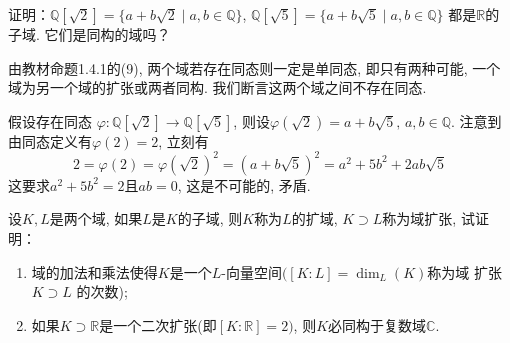 \begin{problem}
    证明：$\mathbb{Q}[\sqrt 2] = \{a + b\sqrt 2 \mid a, b \in \mathbb{Q}\}$,
$\mathbb{Q}[\sqrt 5] = \{a + b\sqrt 5 \mid a, b \in \mathbb{Q}\}$
都是$\mathbb{R}$的子域. 它们是同构的域吗？
\end{problem}

\begin{solution}
    由教材命题1.4.1的(9), 两个域若存在同态则一定是单同态, 即只有两种可能, 
    一个域为另一个域的扩张或两者同构. 我们断言这两个域之间不存在同态.
    
    假设存在同态
$\varphi: \mathbb{Q}[\sqrt{2}] \to \mathbb{Q}[\sqrt{5}]$,
则设$\varphi(\sqrt{2}) = a + b\sqrt{5},\, a, b \in \mathbb{Q}$.
注意到由同态定义有$\varphi(2) = 2$, 立刻有
\[
    2 = \varphi(2) = \varphi(\sqrt{2})^2 = (a + b\sqrt{5})^2 = a^2 + 5b^2 + 2ab\sqrt{5}
\]
这要求$a^2 + 5b^2 = 2$且$ab = 0$, 这是不可能的, 矛盾.
\end{solution}

\begin{problem}\label{ex:1.4.9}
    设$K, L$是两个域, 如果$L$是$K$的子域, 则$K$称为$L$的扩域,
$K \supset L$称为域扩张, 试证明：
\begin{enumerate}[(1)]
    \item 域的加法和乘法使得$K$是一个$L$-向量空间$([K:L] = \dim_L(K)$称为域
扩张$K \supset L$ 的次数);
    \item 如果$K \supset \mathbb{R}$是一个二次扩张(即$[K:\mathbb{R}] = 2)$,
则$K$必同构于复数域$\mathbb{C}$.
\end{enumerate}
\end{problem}

